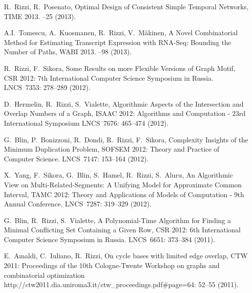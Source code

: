 \begin{etaremune}
  \item {R.~Rizzi, R.~Posenato},
   \newblock Optimal Design of Consistent Simple Temporal Networks,
   \newblock TIME 2013.
   --25 (2013).

  \item {A.I.~Tomescu, A.~Kuosmanen, R.~Rizzi, V.~M\"akinen},
   \newblock A Novel Combinatorial Method for Estimating Transcript Expression with RNA-Seq: Bounding the Number of Paths,
   \newblock WABI 2013.
   --98 (2013).

\vspace{-1.8mm}
  \item {R.~Rizzi, F.~Sikora},
   \newblock Some Results on more Flexible Versions of Graph Motif,
   \newblock CSR 2012: 7th International Computer Science Symposium in Russia.
   \newblock LNCS~7353: 278--289 (2012).

\vspace{-1.8mm}
  \item {D.~Hermelin, R.~Rizzi, S.~Vialette},
   \newblock Algorithmic Aspects of the Intersection and Overlap Numbers of a Graph,
   \newblock ISAAC 2012: Algorithms and Computation - 23rd International Symposium
   \newblock LNCS~7676: 465--474 (2012).

\vspace{-1.8mm}
  \item {G.~Blin, P.~Bonizzoni, R.~Dondi, R.~Rizzi, F.~Sikora},
   \newblock Complexity Insights of the Minimum Duplication Problem,
   \newblock SOFSEM 2012: Theory and Practice of Computer Science.
   \newblock LNCS~7147: 153--164 (2012).

\vspace{-1.8mm}
  \item {X.~Yang, F.~Sikora, G.~Blin, S.~Hamel, R.~Rizzi, S.~Aluru},
   \newblock An Algorithmic View on Multi-Related-Segments: A Unifying Model for Approximate Common Interval,
   \newblock TAMC 2012: Theory and Applications of Models of Computation - 9th Annual Conference.
   \newblock LNCS~7287: 319--329 (2012).

\vspace{-1.8mm}
  \item {G.~Blin, R.~Rizzi, S.~Vialette},
   \newblock A Polynomial-Time Algorithm for Finding a Minimal Conflicting Set Containing a Given Row,
   \newblock CSR 2012: 6th International Computer Science Symposium in Russia.
   \newblock LNCS~6651: 373--384 (2011).

\vspace{-1.8mm}
  \item {E.~Amaldi, C.~Iuliano, R.~Rizzi},
   \newblock On cycle bases with limited edge overlap,
   \newblock CTW 2011: Proceedings of the 10th Cologne-Twente Workshop on graphs and combinatorial optimization
   \newblock http://ctw2011.dia.uniroma3.it/ctw\_proceedings.pdf\#page=64: 52--55 (2011).


\end{etaremune}
